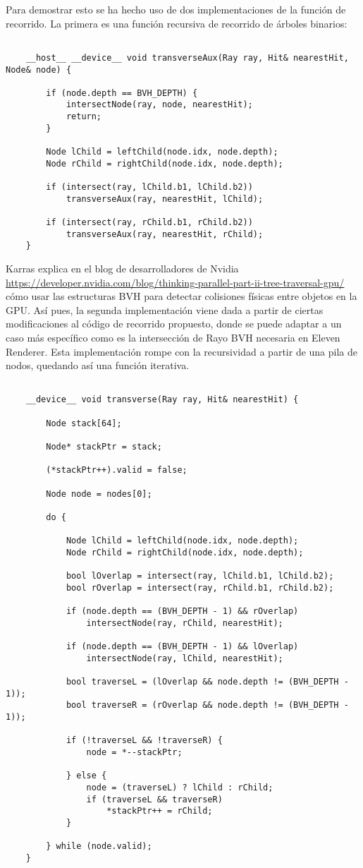 Para demostrar esto se ha hecho uso de dos implementaciones de la función de recorrido. La primera es una función recursiva de recorrido de árboles binarios:

\begin{lstlisting}
	
	__host__ __device__ void transverseAux(Ray ray, Hit& nearestHit, Node& node) {
	
		if (node.depth == BVH_DEPTH) {
			intersectNode(ray, node, nearestHit);
			return;
		}
	
		Node lChild = leftChild(node.idx, node.depth);
		Node rChild = rightChild(node.idx, node.depth);
	
		if (intersect(ray, lChild.b1, lChild.b2))
			transverseAux(ray, nearestHit, lChild);
		
		if (intersect(ray, rChild.b1, rChild.b2))
			transverseAux(ray, nearestHit, rChild);		
	}

\end{lstlisting}

	
Karras explica en el blog de desarrolladores de Nvidia \url{https://developer.nvidia.com/blog/thinking-parallel-part-ii-tree-traversal-gpu/} cómo usar las estructuras BVH para detectar colisiones físicas entre objetos en la GPU. Así pues, la segunda implementación viene dada a partir de ciertas modificaciones al código de recorrido propuesto, donde se puede adaptar a un caso más específico como es la intersección de Rayo \- BVH necesaria en Eleven Renderer. Esta implementación rompe con la recursividad a partir de una pila de nodos, quedando así una función iterativa.

\begin{lstlisting}
		
	__device__ void transverse(Ray ray, Hit& nearestHit) {

		Node stack[64];

		Node* stackPtr = stack;

		(*stackPtr++).valid = false;

		Node node = nodes[0];

		do {

			Node lChild = leftChild(node.idx, node.depth);
			Node rChild = rightChild(node.idx, node.depth);

			bool lOverlap = intersect(ray, lChild.b1, lChild.b2);
			bool rOverlap = intersect(ray, rChild.b1, rChild.b2);

			if (node.depth == (BVH_DEPTH - 1) && rOverlap)
				intersectNode(ray, rChild, nearestHit);

			if (node.depth == (BVH_DEPTH - 1) && lOverlap)
				intersectNode(ray, lChild, nearestHit);
			
			bool traverseL = (lOverlap && node.depth != (BVH_DEPTH - 1));
			bool traverseR = (rOverlap && node.depth != (BVH_DEPTH - 1));

			if (!traverseL && !traverseR) {
				node = *--stackPtr;

			} else {
				node = (traverseL) ? lChild : rChild;
				if (traverseL && traverseR)
					*stackPtr++ = rChild;
			}

		} while (node.valid);
	}
	
\end{lstlisting}

